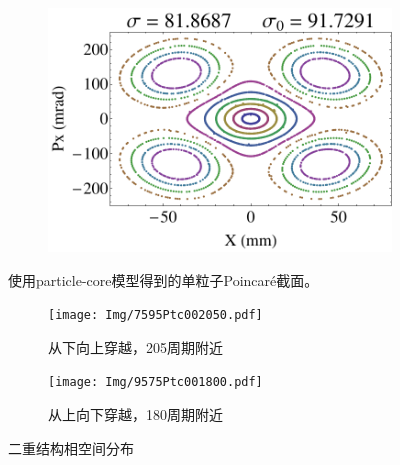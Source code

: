 \begin{figure}
\begin{subfigure}[b]{0.24\textwidth}
        \caption{}\label{sfig:TestPtc3}
    \end{subfigure}
    \begin{subfigure}[b]{0.24\textwidth}
        \includegraphics[width=\textwidth]{Img/TestParticle4.pdf}
        \caption{}\label{sfig:TestPtc4}
    \end{subfigure}
    \caption{使用particle-core模型得到的单粒子Poincar\'{e}截面。}
    \label{fig:TestPtc}
\end{figure}

\begin{figure}[!hbp]
    \centering
    \begin{subfigure}[b]{0.45\textwidth}
        \texttt{[image: Img/7595Ptc002050.pdf]}
        \caption{从下向上穿越，205周期附近}
        \label{sfig:Ptc2tails1}
    \end{subfigure}
    \begin{subfigure}[b]{0.45\textwidth}
        \texttt{[image: Img/9575Ptc001800.pdf]}
        \caption{从上向下穿越，180周期附近}
        \label{sfig:Ptc2tails2}
    \end{subfigure}
    \caption{二重结构相空间分布}
    \label{fig:Ptc2tail}
\end{figure}


